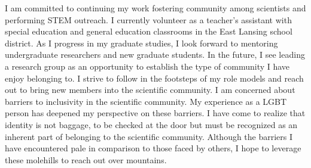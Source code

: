 I am committed to continuing my work fostering community among scientists and performing STEM outreach.
I currently volunteer as a teacher's assistant with special education and general education classrooms in the East Lansing school district.
As I progress in my graduate studies, I look forward to mentoring undergraduate researchers and new graduate students.
In the future, I see leading a research group as an opportunity to establish the type of community I have enjoy belonging to.
I strive to follow in the footsteps of my role models and reach out to bring new members into the scientific community.
I am concerned about barriers to inclusivity in the scientific community.
My experience as a LGBT person has deepened my perspective on these barriers.
I have come to realize that identity is not baggage, to be checked at the door but must be recognized as an inherent part of belonging to the scientific community.
Although the barriers I have encountered pale in comparison to those faced by others, I hope to leverage these molehills to reach out over mountains.
